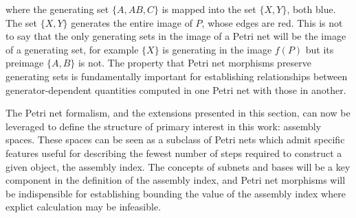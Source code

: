 \documentclass[aps,prd,onecolumn,nofootinbib,letterpaper,preprintnumbers,superscriptaddress,eqsecnum]{revtex4}
\theoremstyle{definition}
\begin{document}
\begin{center}
{
    }
\end{center}
where the generating set $\{A, AB, C\}$ is mapped into the set $\{X, Y\}$, both blue.
The set $\{X, Y\}$ generates the entire image of $P$, whose edges are red.
This is not to say that the only generating sets in the image of a Petri net will be the image of a generating set, for example $\{X\}$ is generating in the image $f(P)$ but its preimage $\{A,B\}$ is not. The property that Petri net morphisms preserve generating sets is fundamentally important for establishing relationships between generator-dependent quantities computed in one Petri net with those in another.

The Petri net formalism, and the extensions presented in this section, can now be leveraged to define the structure of primary interest in this work: assembly spaces.
These spaces can be seen as a subclass of Petri nets which admit specific features useful for describing the fewest number of steps required to construct a given object, the assembly index.
The concepts of subnets and bases will be a key component in the definition of the assembly index, and Petri net morphisms will be indispensible for establishing bounding the value of the assembly index where explict calculation may be infeasible.
\end{document}
